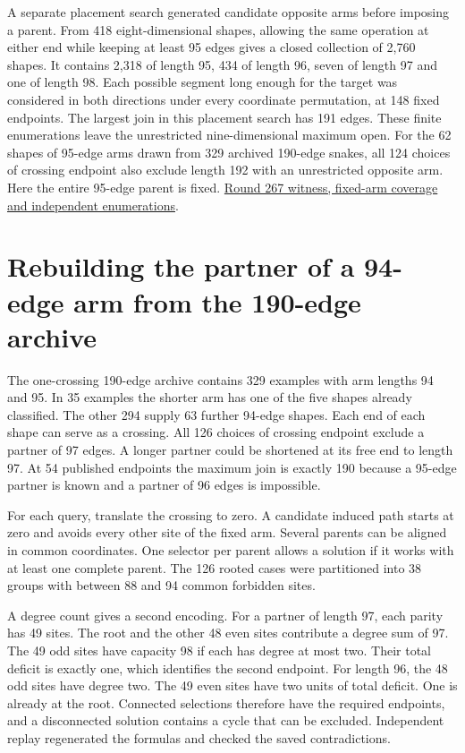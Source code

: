 \documentclass[11pt,a4paper]{article}
\theoremstyle{definition}
\theoremstyle{remark}
\begin{document}
A separate placement search generated candidate opposite arms before
imposing a parent. From 418 eight-dimensional shapes, allowing the same
operation at either end while keeping at least 95 edges gives a closed
collection of 2,760 shapes. It contains 2,318 of length 95, 434 of length
96, seven of length 97 and one of length 98. Each possible segment long
enough for the target was considered in both directions under every
coordinate permutation, at 148 fixed endpoints. The largest join in this
placement search has 191 edges. These finite enumerations leave the
unrestricted nine-dimensional maximum open.
For the 62 shapes of 95-edge arms drawn from 329 archived 190-edge snakes, all 124 choices of crossing endpoint also exclude length 192 with an unrestricted opposite arm. Here the entire 95-edge parent is fixed.
\href{https://github.com/hironaka-iori/Snake-in-the-box-in-9/tree/main/milestones/267-fixed-arm-extensions}{Round 267 witness, fixed-arm coverage and independent enumerations}.

\section{Rebuilding the partner of a 94-edge arm from the 190-edge archive}
The one-crossing 190-edge archive contains 329 examples with arm lengths
94 and 95. In 35 examples the shorter arm has one of the five shapes
already classified. The other 294 supply 63 further 94-edge shapes.
Each end of each shape can serve as a crossing. All 126 choices of crossing endpoint exclude a partner of 97 edges.
A longer partner could be shortened at its free end to length 97.
At 54 published endpoints the maximum join is exactly 190 because a 95-edge partner is known and a partner of 96 edges is impossible.

For each query, translate the crossing to zero. A candidate induced path
starts at zero and avoids every other site of the fixed arm. Several
parents can be aligned in common coordinates. One selector per parent
allows a solution if it works with at least one complete parent. The
126 rooted cases were partitioned into 38 groups with between 88 and
94 common forbidden sites.

A degree count gives a second encoding. For a partner of length 97,
each parity has 49 sites. The root and the other 48 even sites contribute
a degree sum of 97. The 49 odd sites have capacity 98 if each has degree
at most two. Their total deficit is exactly one, which identifies the
second endpoint. For length 96, the 48 odd sites have degree two. The
49 even sites have two units of total deficit. One is already at the root.
Connected selections therefore have the required endpoints, and a
disconnected solution contains a cycle that can be excluded.
Independent replay regenerated the formulas and checked the saved contradictions.
\end{document}
